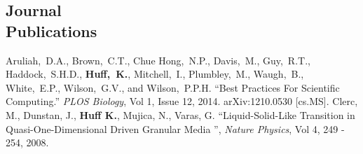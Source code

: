 \documentclass[margin,line]{resume}
\begin{document}
\begin{resume}
    \section{\mysidestyle Journal\\Publications}
      \begin{bibenum}
       Aruliah,~D.A., Brown,~C.T., Chue Hong,~N.P., Davis,~M., Guy,~R.T., 
          Haddock,~S.H.D., \textbf{Huff,~K.}, Mitchell,~I., Plumbley,~M., Waugh,~B., 
          White,~E.P., Wilson,~G.V., and Wilson,~P.P.H.  ``Best Practices For 
          Scientific Computing.'' \textsl{PLOS Biology}, Vol 1, Issue 12, 2014. 
          arXiv:1210.0530 [cs.MS].
       Clerc, M., Dunstan, J., \textbf{Huff K.}, Mujica, N., Varas, G. 
          ``Liquid-Solid-Like Transition in Quasi-One-Dimensional Driven 
          Granular Media '',  \textsl{Nature Physics}, Vol 4, 249 - 254, 2008.
      \end{bibenum}

\end{resume}
\end{document}
